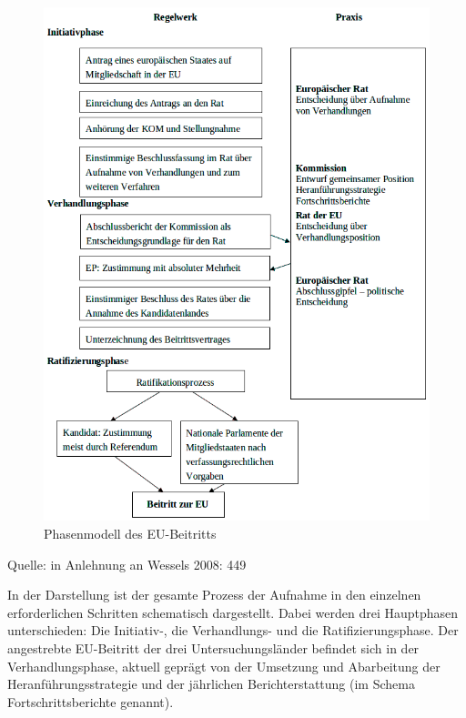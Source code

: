 \begin{figure}[H]
  \centering
   \caption{Phasenmodell des EU-Beitritts }
  \includegraphics[width=5in]{Material/Phasenmodell_ohneRand}
\end{figure}
Quelle: in Anlehnung an Wessels 2008: 449\par
In der Darstellung ist der gesamte Prozess der Aufnahme in den einzelnen erforderlichen Schritten schematisch dargestellt. Dabei werden drei Hauptphasen unterschieden: Die Initiativ-, die Verhandlungs- und die Ratifizierungsphase. Der angestrebte EU-Beitritt der drei Untersuchungsländer befindet sich in der Verhandlungsphase, aktuell geprägt von der Umsetzung und Abarbeitung der Heranführungsstrategie und der jährlichen Berichterstattung (im Schema Fortschrittsberichte genannt).\par

